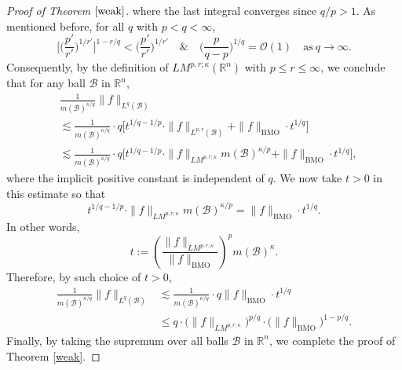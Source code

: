 \documentclass{birkjour}
\theoremstyle{definition}
\theoremstyle{remark}
\numberwithin{equation}{section}
\begin{document}
\begin{proof}[Proof of Theorem $\ref{weak}$]
where the last integral converges since $q/p>1$. As mentioned before, for all $q$ with $p<q<\infty$,
\begin{equation*}
\Big[\Big(\frac{p'}{r'}\Big)^{1/{r'}}\Big]^{1-r/q}<\Big(\frac{p'}{r'}\Big)^{1/{r'}}\quad \&\quad
\Big(\frac{p}{q-p}\Big)^{1/q}=\mathcal{O}(1)\quad \mbox{as}~ q\to\infty.
\end{equation*}
Consequently, by the definition of $LM^{p,r;\kappa}(\mathbb R^n)$ with $p\leq r\leq\infty$, we conclude that for any ball $\mathcal{B}$ in $\mathbb R^n$,
\begin{equation*}
\begin{split}
&\frac{1}{m(\mathcal{B})^{\kappa/q}}\|f\|_{L^{q}(\mathcal{B})}\\
&\lesssim \frac{1}{m(\mathcal{B})^{\kappa/q}}
\cdot q\Big[t^{1/q-1/p}\cdot\|f\|_{L^{p,r}(\mathcal{B})}+\|f\|_{\mathrm{BMO}}\cdot t^{1/q}\Big]\\
&\lesssim\frac{1}{m(\mathcal{B})^{\kappa/q}}
\cdot q\Big[t^{1/q-1/p}\cdot\|f\|_{LM^{p,r;\kappa}}m(\mathcal{B})^{\kappa/p}+\|f\|_{\mathrm{BMO}}\cdot t^{1/q}\Big],
\end{split}
\end{equation*}
where the implicit positive constant is independent of $q$. We now take $t>0$ in this estimate so that
\begin{equation*}
t^{1/q-1/p}\cdot\|f\|_{LM^{p,r;\kappa}}m(\mathcal{B})^{\kappa/p}=\|f\|_{\mathrm{BMO}}\cdot t^{1/q}.
\end{equation*}
In other words,
\begin{equation*}
t:=\left(\frac{\|f\|_{LM^{p,r;\kappa}}}{\|f\|_{\mathrm{BMO}}}\right)^pm(\mathcal{B})^{\kappa}.
\end{equation*}
Therefore, by such choice of $t>0$,
\begin{equation*}
\begin{split}
\frac{1}{m(\mathcal{B})^{\kappa/q}}\|f\|_{L^{q}(\mathcal{B})}
&\lesssim\frac{1}{m(\mathcal{B})^{\kappa/q}}\cdot q\|f\|_{\mathrm{BMO}}\cdot t^{1/q}\\
&\leq q\cdot\big(\|f\|_{LM^{p,r;\kappa}}\big)^{p/q}\cdot\big(\|f\|_{\mathrm{BMO}}\big)^{1-p/q}.
\end{split}
\end{equation*}
Finally, by taking the supremum over all balls $\mathcal{B}$ in $\mathbb R^n$, we complete the proof of Theorem \ref{weak}.
\end{proof}
\end{document}
